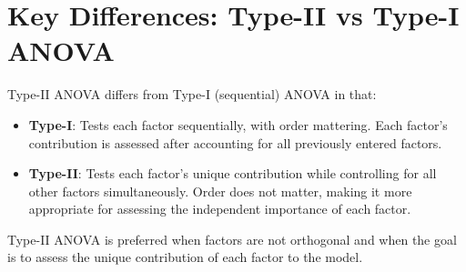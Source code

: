 \documentclass[11pt]{article}
\begin{document}
\section{Key Differences: Type-II vs Type-I ANOVA}

Type-II ANOVA differs from Type-I (sequential) ANOVA in that:
\begin{itemize}
    \item \textbf{Type-I}: Tests each factor sequentially, with order mattering. Each factor's contribution is assessed after accounting for all previously entered factors.
    \item \textbf{Type-II}: Tests each factor's unique contribution while controlling for all other factors simultaneously. Order does not matter, making it more appropriate for assessing the independent importance of each factor.
\end{itemize}

Type-II ANOVA is preferred when factors are not orthogonal and when the goal is to assess the unique contribution of each factor to the model.
\end{document}
